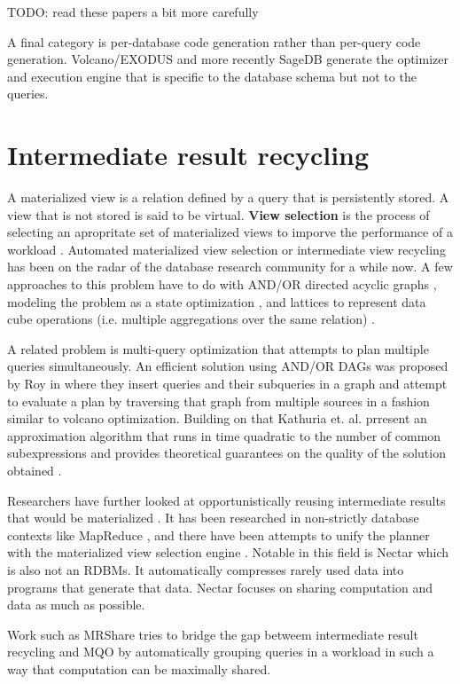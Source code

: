 TODO: read these papers a bit more carefully

A final category is per-database code generation rather than per-query
code generation. Volcano/EXODUS
\cite{graefeVolcanoOptimizerGenerator1993a} and more recently SageDB
\cite{kraskaSageDBLearnedDatabase} generate the optimizer and execution
engine that is specific to the database schema but not to the queries.


\section{Intermediate result recycling}
\label{sec:org1a32ec6}
A materialized view is a relation defined by a query that is
persistently stored. A view that is not stored is said to be
virtual. \textbf{View selection} is the process of selecting an apropritate
set of materialized views to imporve the performance of a workload
\cite{mamiSurveyViewSelection2012}.  Automated materialized view
selection or intermediate view recycling has been on the radar of the
database research community for a while now. A few approaches to this
problem have to do with AND/OR directed acyclic graphs
\cite{guptaSelectionViewsMaterialize1997}, modeling the problem as a
state optimization \cite{theodoratosDataWarehouseConfiguration1997},
and lattices to represent data cube operations (i.e. multiple
aggregations over the same relation) \cite{ImplementingDataCubes}.

A related problem is multi-query optimization
\cite{theodoratosDataWarehouseConfiguration1997} that attempts to plan
multiple queries simultaneously. An efficient solution using AND/OR
DAGs was proposed by Roy in \cite{royEfficientExtensibleAlgorithms2000}
where they insert queries and their subqueries in a graph and attempt
to evaluate a plan by traversing that graph from multiple sources in a
fashion similar to volcano optimization. Building on that Kathuria
et. al. prresent an approximation algorithm that runs in time
quadratic to the number of common subexpressions and provides
theoretical guarantees on the quality of the solution obtained
\cite{kathuriaEfficientProvableMultiquery2017}.

Researchers have further looked at opportunistically reusing
intermediate results that would be materialized
\cite{ivanovaArchitectureRecyclingIntermediates2010,nagelRecyclingPipelinedQuery2013}. It
has been researched in non-strictly database contexts like MapReduce
\cite{elghandourReStoreReusingResults2012a}, and there have been
attempts to unify the planner with the materialized view selection
engine \cite{perezHistoryawareQueryOptimization2014a}. Notable in this
field is Nectar \cite{gundaNectarAutomaticManagement2010} which is also
not an RDBMs. It automatically compresses rarely used data into
programs that generate that data. Nectar focuses on sharing
computation and data as much as possible.

Work such as MRShare \cite{nykielMRShareSharingMultiple2010} tries to
bridge the gap betweem intermediate result recycling and MQO by
automatically grouping queries in a workload in such a way that
computation can be maximally shared.
